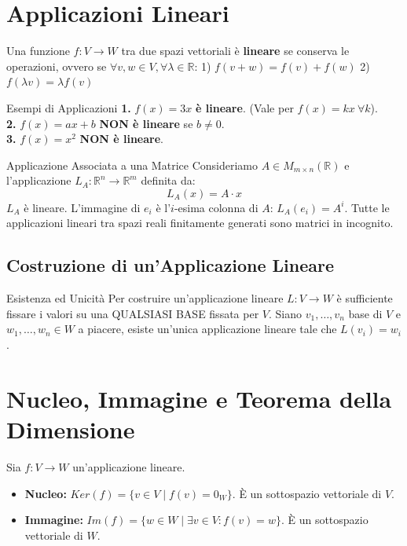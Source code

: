\section{Applicazioni Lineari}

\begin{definitionbox}
Una funzione $f: V \to W$ tra due spazi vettoriali è \textbf{lineare} se conserva le operazioni, ovvero se $\forall v, w \in V, \forall \lambda \in \mathbb{R}$:
1) $f(v+w) = f(v) + f(w)$
2) $f(\lambda v) = \lambda f(v)$
\end{definitionbox}

\begin{example}{Esempi di Applicazioni}{}
\textbf{1.} $f(x) = 3x$ \textbf{è lineare}. (Vale per $f(x) = kx \ \forall k$).\\
\textbf{2.} $f(x) = ax + b$ \textbf{NON è lineare} se $b \neq 0$.\\
\textbf{3.} $f(x) = x^2$ \textbf{NON è lineare}.
\end{example}

\begin{concept}{Applicazione Associata a una Matrice}
Consideriamo $A \in M_{m \times n}(\mathbb{R})$ e l'applicazione $L_A: \mathbb{R}^n \to \mathbb{R}^m$ definita da:
$$ L_A(x) = A \cdot x $$
$L_A$ è lineare. L'immagine di $e_i$ è l'$i$-esima colonna di $A$: $L_A(e_i) = A^i$.
Tutte le applicazioni lineari tra spazi reali finitamente generati sono matrici in incognito.
\end{concept}

\subsection{Costruzione di un'Applicazione Lineare}
\begin{proposition}{Esistenza ed Unicità}{}
Per costruire un'applicazione lineare $L: V \to W$ è sufficiente fissare i valori su una QUALSIASI BASE fissata per $V$. Siano $v_1, \dots, v_n$ base di $V$ e $w_1, \dots, w_n \in W$ a piacere, esiste un'unica applicazione lineare tale che $L(v_i) = w_i$.
\end{proposition}

\section{Nucleo, Immagine e Teorema della Dimensione}

\begin{definitionbox}
Sia $f: V \to W$ un'applicazione lineare. 
\begin{itemize}
    \item \textbf{Nucleo:} $Ker(f) = \{ v \in V \mid f(v) = 0_W \}$. È un sottospazio vettoriale di $V$.
    \item \textbf{Immagine:} $Im(f) = \{ w \in W \mid \exists v \in V : f(v) = w \}$. È un sottospazio vettoriale di $W$.
\end{itemize}
\end{definitionbox}

